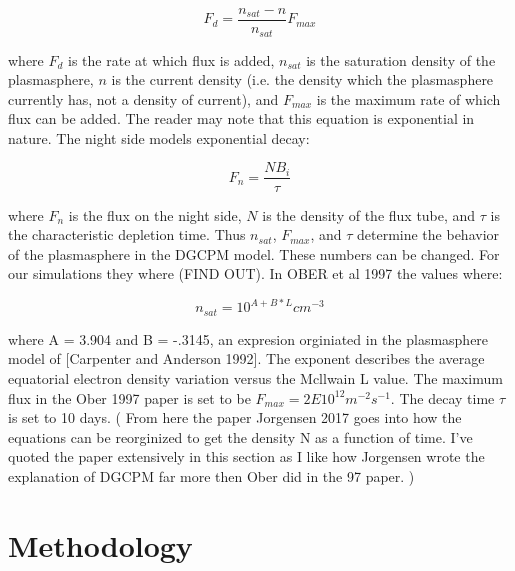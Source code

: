 \documentclass[utf8]{report}
\begin{document}
\begin{equation}
    F_{d} = \frac{n_{sat} - n}{n_{sat}}F_{max}
    \label{eq:DGCPM.2}
\end{equation}

where $F_{d}$ is the rate at which flux is added, $n_{sat}$ is the saturation density of the plasmasphere, $n$ is the current density (i.e. the density which the plasmasphere currently has, not a density of current), and $F_{max}$ is the maximum rate of which flux can be added. The reader may note that this equation is exponential in nature. The night side models exponential decay: 

\begin{equation}
    F_{n} = \frac{NB_{i}}{\tau}
    \label{eq:DGCPM.3}
\end{equation}

where $F_{n}$ is the flux on the night side, $N$ is the density of the flux tube, and $\tau$ is the characteristic depletion time. Thus $n_{sat}$, $F_{max}$, and $\tau$ determine the behavior of the plasmasphere in the DGCPM model. These numbers can be changed. For our simulations they where  (\color{red}FIND OUT\color{black}). In 
OBER et al 1997 the values where: 

\begin{equation}
    n_{sat} = 10^{A+B*L}  cm^{-3}
\end{equation}

where A = 3.904 and B = -.3145, an expresion orginiated in the plasmasphere model of [Carpenter and Anderson 1992]. The exponent describes the average equatorial electron density variation versus the Mcllwain L value. The maximum flux in the Ober 1997 paper is set to be $F_{max}= 2 E 10^{12} m^{-2}s^{-1}$. The decay time $\tau$ is set to 10 days. (\color{red} From here the paper Jorgensen 2017 goes into how the equations can be reorginized to get the density N as a function of time. I've quoted the paper extensively in this section as I like how Jorgensen wrote the explanation of DGCPM far more then Ober did in the 97 paper. \color{black})


\chapter{Methodology}
\end{document}
